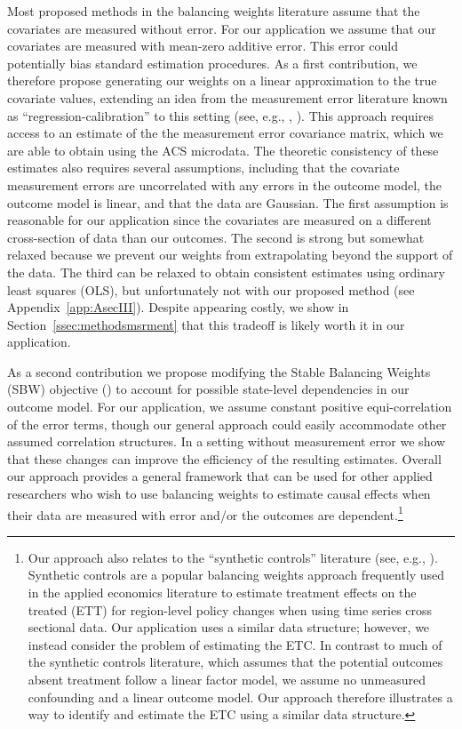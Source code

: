 \documentclass[aoas]{imsart}
\theoremstyle{plain}
\theoremstyle{remark}
\begin{document}
Most proposed methods in the balancing weights literature assume that the covariates are measured without error. For our application we assume that our covariates are measured with mean-zero additive error. This error could potentially bias standard estimation procedures. As a first contribution, we therefore propose generating our weights on a linear approximation to the true covariate values, extending an idea from the measurement error literature known as ``regression-calibration'' to this setting (see, e.g., \cite{carroll2006measurement}, \cite{gleser1992importance}). This approach requires access to an estimate of the the measurement error covariance matrix, which we are able to obtain using the ACS microdata. The theoretic consistency of these estimates also requires several assumptions, including that the covariate measurement errors are uncorrelated with any errors in the outcome model, the outcome model is linear, and that the data are Gaussian. The first assumption is reasonable for our application since the covariates are measured on a different cross-section of data than our outcomes. The second is strong but somewhat relaxed because we prevent our weights from extrapolating beyond the support of the data. The third can be relaxed to obtain consistent estimates using ordinary least squares (OLS), but unfortunately not with our proposed method (see Appendix~\ref{app:AsecIII}). Despite appearing costly, we show in Section~\ref{ssec:methodsmsrment} that this tradeoff is likely worth it in our application.

As a second contribution we propose modifying the Stable Balancing Weights (SBW) objective (\cite{zubizarreta2015stable}) to account for possible state-level dependencies in our outcome model. For our application, we assume constant positive equi-correlation of the error terms, though our general approach could easily accommodate other assumed correlation structures. In a setting without measurement error we show that these changes can improve the efficiency of the resulting estimates. Overall our approach provides a general framework that can be used for other applied researchers who wish to use balancing weights to estimate causal effects when their data are measured with error and/or the outcomes are dependent.\footnote{Our approach also relates to the ``synthetic controls'' literature (see, e.g., \cite{abadie2010synthetic}). Synthetic controls are a popular balancing weights approach frequently used in the applied economics literature to estimate treatment effects on the treated (ETT) for region-level policy changes when using time series cross sectional data. Our application uses a similar data structure; however, we instead consider the problem of estimating the ETC. In contrast to much of the synthetic controls literature, which assumes that the potential outcomes absent treatment follow a linear factor model, we assume no unmeasured confounding and a linear outcome model. Our approach therefore illustrates a way to identify and estimate the ETC using a similar data structure.}
\end{document}

